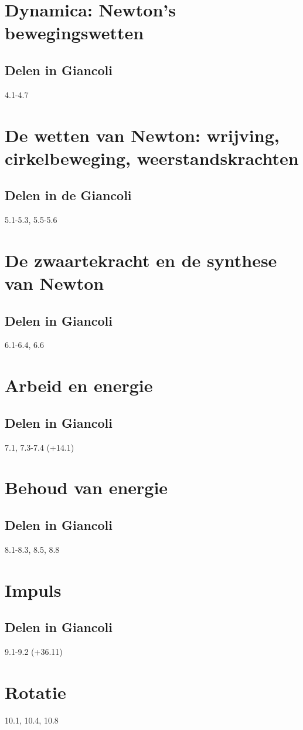 \documentclass[12pt,a4paper]{article}
\begin{document}
	\section{Dynamica: Newton's bewegingswetten}
	\subsection{Delen in Giancoli}
	4.1-4.7
	\section{De wetten van Newton: wrijving, cirkelbeweging, weerstandskrachten}
	\subsection{Delen in de Giancoli}
	5.1-5.3, 5.5-5.6
	\section{De zwaartekracht en de synthese van Newton}
	\subsection{Delen in Giancoli}
	6.1-6.4, 6.6
	\section{Arbeid en energie}
	\subsection{Delen in Giancoli}
	7.1, 7.3-7.4 (+14.1)
	\section{Behoud van energie}
	\subsection{Delen in Giancoli}
	8.1-8.3, 8.5, 8.8
	\section{Impuls}
	\subsection{Delen in Giancoli}
	9.1-9.2 (+36.11)
	\section{Rotatie}
	10.1, 10.4, 10.8
\end{document}
